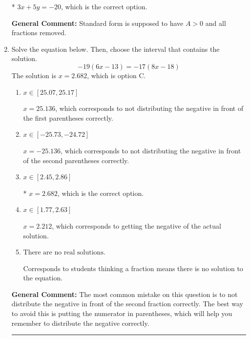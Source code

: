 \documentclass{extbook}[14pt]
\newcommand{\litem}[1]{\item #1

\rule{\textwidth}{0.4pt}}
\begin{document}
\begin{enumerate}
{\begin{enumerate}[label=\Alph*.]
* $3x + 5y = -20$, which is the correct option.
\end{enumerate}

\textbf{General Comment:} Standard form is supposed to have $A > 0$ and all fractions removed.
}
\litem{
Solve the equation below. Then, choose the interval that contains the solution.
\[ -19(6x -13) = -17(8x -18) \]The solution is \( x = 2.682 \), which is option C.\begin{enumerate}[label=\Alph*.]
\item \( x \in [25.07, 25.17] \)

$x = 25.136$, which corresponds to not distributing the negative in front of the first parentheses correctly.
\item \( x \in [-25.73, -24.72] \)

$x = -25.136$, which corresponds to not distributing the negative in front of the second parentheses correctly.
\item \( x \in [2.45, 2.86] \)

* $x = 2.682$, which is the correct option.
\item \( x \in [1.77, 2.63] \)

$x = 2.212$, which corresponds to getting the negative of the actual solution.
\item \( \text{There are no real solutions.} \)

Corresponds to students thinking a fraction means there is no solution to the equation.
\end{enumerate}

\textbf{General Comment:} The most common mistake on this question is to not distribute the negative in front of the second fraction correctly. The best way to avoid this is putting the numerator in parentheses, which will help you remember to distribute the negative correctly.
}
\end{enumerate}
\end{document}
